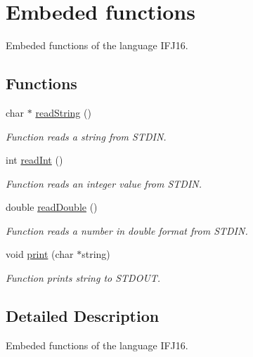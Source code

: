 \hypertarget{group__embedded__functions}{}\section{Embeded functions}
\label{group__embedded__functions}


Embeded functions of the language I\+F\+J16.  


\subsection*{Functions}
\begin{DoxyCompactItemize}
\item 
char $\ast$ \hyperlink{group__embedded__functions_gaaad595b5e15a2a16230783d586186f0c}{read\+String} ()
\begin{DoxyCompactList}\small\item\em Function reads a string from S\+T\+D\+IN. \end{DoxyCompactList}\item 
int \hyperlink{group__embedded__functions_gac4dc9964d286ddbbd2a108991190d39d}{read\+Int} ()
\begin{DoxyCompactList}\small\item\em Function reads an integer value from S\+T\+D\+IN. \end{DoxyCompactList}\item 
double \hyperlink{group__embedded__functions_ga840ea5c01770156bd51bdb9f65f44e30}{read\+Double} ()
\begin{DoxyCompactList}\small\item\em Function reads a number in double format from S\+T\+D\+IN. \end{DoxyCompactList}\item 
void \hyperlink{group__embedded__functions_ga56f9aaf3081ee33dee941e011f177c61}{print} (char $\ast$string)\hypertarget{group__embedded__functions_ga56f9aaf3081ee33dee941e011f177c61}{}\label{group__embedded__functions_ga56f9aaf3081ee33dee941e011f177c61}

\begin{DoxyCompactList}\small\item\em Function prints string to S\+T\+D\+O\+UT. \end{DoxyCompactList}\end{DoxyCompactItemize}


\subsection{Detailed Description}
Embeded functions of the language I\+F\+J16. 



